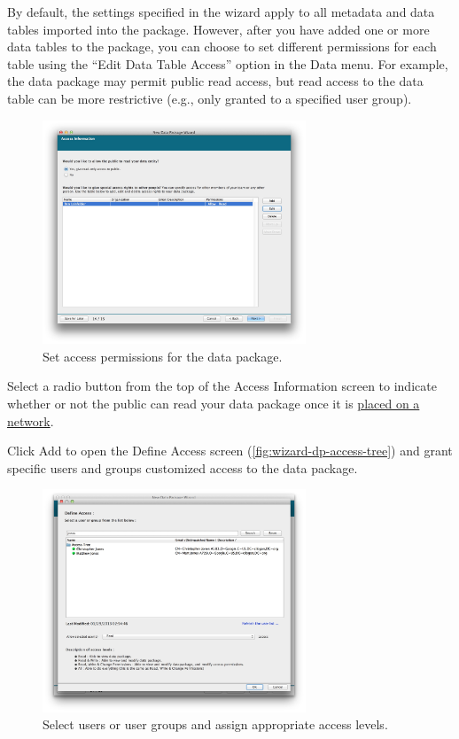 By default, the settings specified in the wizard apply to all metadata
and data tables imported into the package. However, after you have added
one or more data tables to the package, you can choose to set different
permissions for each table using the ``Edit Data Table Access'' option in
the Data menu. For example, the data package may permit public read
access, but read access to the data table can be more restrictive (e.g.,
only granted to a specified user group). 

\begin{figure}
  \centering
    \includegraphics[width=0.7\textwidth]{images/wizard-dp-access.jpg}
  \caption{Set access permissions for the data package.}
  \label{fig:wizard-dp-access}
\end{figure}

Select a radio button from the top of the Access Information screen to
indicate whether or not the public can read your data package once it is
\hyperref[sec:uploading]{placed on a network}.

Click Add to open the Define Access screen
(\autoref{fig:wizard-dp-access-tree}) and grant specific users and
groups customized access to the data package. 

\begin{figure}
  \centering
    \includegraphics[width=0.7\textwidth]{images/wizard-dp-access-tree.jpg}
  \caption{Select users or user groups and assign appropriate access
    levels.}
  \label{fig:wizard-dp-access-tree}
\end{figure}


